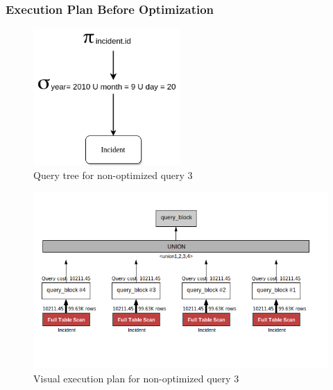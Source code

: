 \subsubsection{Execution Plan Before Optimization}
\begin{figure}[H]
    \centering
    \includegraphics[width=0.5\textwidth]{images/query_trees/query3-optimized-and-non-optimized.png}
    \caption{Query tree for non-optimized query 3}
\end{figure}
\begin{figure}[H]
    \centering
    \includegraphics[width=\textwidth]{images/execution_plans/q3-1-old.png}
    \caption{Visual execution plan for non-optimized query 3}
\end{figure}

